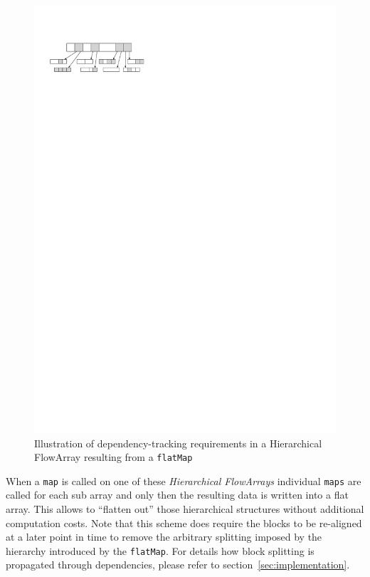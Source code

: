 \documentclass[runningheads,a4paper,fleqn]{llncs}
\begin{document}
\begin{figure}
  \centering
  \includegraphics{flatMap-dependency}
  \caption{Illustration of dependency-tracking requirements in a
    Hierarchical FlowArray resulting from a \texttt{flatMap}}
  \label{fig:flatMap-dependency}
\end{figure}

When a \texttt{map} is called on one of these \emph{Hierarchical
  FlowArrays} individual \texttt{maps} are called for each sub array
and only then the resulting data is written into a flat array. This
allows to ``flatten out'' those hierarchical structures without
additional computation costs. Note that this scheme does require the
blocks to be re-aligned at a later point in time to remove the
arbitrary splitting imposed by the hierarchy introduced by the
\texttt{flatMap}. For details how block splitting is propagated
through dependencies, please refer to
section~\ref{sec:implementation}.
\end{document}
